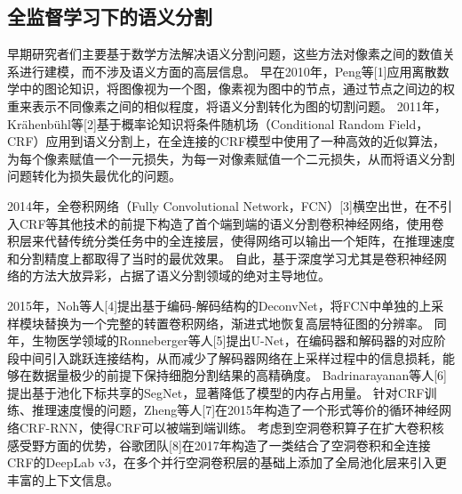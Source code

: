 \subsection{全监督学习下的语义分割}
早期研究者们主要基于数学方法解决语义分割问题，这些方法对像素之间的数值关系进行建模，而不涉及语义方面的高层信息。
早在2010年，Peng等[1]应用离散数学中的图论知识，将图像视为一个图，像素视为图中的节点，通过节点之间边的权重来表示不同像素之间的相似程度，将语义分割转化为图的切割问题。
2011年，Krähenbühl等[2]基于概率论知识将条件随机场（Conditional Random Field，CRF）应用到语义分割上，在全连接的CRF模型中使用了一种高效的近似算法，为每个像素赋值一个一元损失，为每一对像素赋值一个二元损失，从而将语义分割问题转化为损失最优化的问题。
\par
2014年，全卷积网络（Fully Convolutional Network，FCN）[3]横空出世，在不引入CRF等其他技术的前提下构造了首个端到端的语义分割卷积神经网络，使用卷积层来代替传统分类任务中的全连接层，使得网络可以输出一个矩阵，在推理速度和分割精度上都取得了当时的最优效果。
自此，基于深度学习尤其是卷积神经网络的方法大放异彩，占据了语义分割领域的绝对主导地位。
\par
2015年，Noh等人[4]提出基于编码-解码结构的DeconvNet，将FCN中单独的上采样模块替换为一个完整的转置卷积网络，渐进式地恢复高层特征图的分辨率。
同年，生物医学领域的Ronneberger等人[5]提出U-Net，在编码器和解码器的对应阶段中间引入跳跃连接结构，从而减少了解码器网络在上采样过程中的信息损耗，能够在数据量极少的前提下保持细胞分割结果的高精确度。
Badrinarayanan等人[6]提出基于池化下标共享的SegNet，显著降低了模型的内存占用量。
针对CRF训练、推理速度慢的问题，Zheng等人[7]在2015年构造了一个形式等价的循环神经网络CRF-RNN，使得CRF可以被端到端训练。
考虑到空洞卷积算子在扩大卷积核感受野方面的优势，谷歌团队[8]在2017年构造了一类结合了空洞卷积和全连接CRF的DeepLab v3，在多个并行空洞卷积层的基础上添加了全局池化层来引入更丰富的上下文信息。
